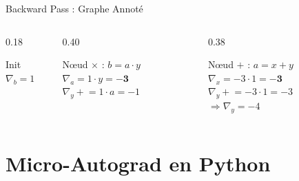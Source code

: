 \documentclass[aspectratio=169, 10pt]{beamer}
\begin{document}
\begin{frame}{Backward Pass : Graphe Annoté}
  \vspace{0.3em}
  \begin{columns}[T]
    \begin{column}{0.18\textwidth}
      \begin{block}{\small Init}
        \small $\nabla_b = 1$
      \end{block}
    \end{column}
    \begin{column}{0.40\textwidth}
      \begin{alertblock}{\small Nœud $\times$ : $b = a \cdot y$}
        \small
        $\nabla_a = 1 \cdot y = \mathbf{-3}$\\[2pt]
        $\nabla_y \mathrel{+}= 1 \cdot a = -1$
      \end{alertblock}
    \end{column}
    \begin{column}{0.38\textwidth}
      \begin{alertblock}{\small Nœud $+$ : $a = x + y$}
        \small
        $\nabla_x = -3 \cdot 1 = \mathbf{-3}$\\[2pt]
        $\nabla_y \mathrel{+}= -3 \cdot 1 = -3$\\[1pt]
        \textcolor{jedy_alert}{$\Rightarrow \nabla_y = -4$}
      \end{alertblock}
    \end{column}
  \end{columns}
\end{frame}

\section{Micro-Autograd en Python}
\end{document}
